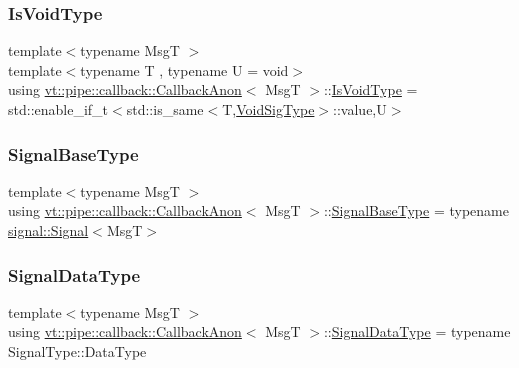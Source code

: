 \subsubsection{\texorpdfstring{Is\+Void\+Type}{IsVoidType}}
{\footnotesize\ttfamily template$<$typename MsgT $>$ \\
template$<$typename T , typename U  = void$>$ \\
using \hyperlink{structvt_1_1pipe_1_1callback_1_1_callback_anon}{vt\+::pipe\+::callback\+::\+Callback\+Anon}$<$ MsgT $>$\+::\hyperlink{structvt_1_1pipe_1_1callback_1_1_callback_anon_a3aa19d4a1044d57ba4af22015331c20a}{Is\+Void\+Type} =  std\+::enable\+\_\+if\+\_\+t$<$std\+::is\+\_\+same$<$T,\hyperlink{structvt_1_1pipe_1_1callback_1_1_callback_anon_a37f2e8be7b6c014a2a33232b678a05cc}{Void\+Sig\+Type}$>$\+::value,U$>$}

\mbox{\label{structvt_1_1pipe_1_1callback_1_1_callback_anon_a84629a45a0c53a8804a4fa68b6b4aaa7}} 
\subsubsection{\texorpdfstring{Signal\+Base\+Type}{SignalBaseType}}
{\footnotesize\ttfamily template$<$typename MsgT $>$ \\
using \hyperlink{structvt_1_1pipe_1_1callback_1_1_callback_anon}{vt\+::pipe\+::callback\+::\+Callback\+Anon}$<$ MsgT $>$\+::\hyperlink{structvt_1_1pipe_1_1callback_1_1_callback_anon_a84629a45a0c53a8804a4fa68b6b4aaa7}{Signal\+Base\+Type} =  typename \hyperlink{structvt_1_1pipe_1_1signal_1_1_signal}{signal\+::\+Signal}$<$MsgT$>$}

\mbox{\label{structvt_1_1pipe_1_1callback_1_1_callback_anon_ac503b95feb44bb0b60c1d69e1ed29074}} 
\subsubsection{\texorpdfstring{Signal\+Data\+Type}{SignalDataType}}
{\footnotesize\ttfamily template$<$typename MsgT $>$ \\
using \hyperlink{structvt_1_1pipe_1_1callback_1_1_callback_anon}{vt\+::pipe\+::callback\+::\+Callback\+Anon}$<$ MsgT $>$\+::\hyperlink{structvt_1_1pipe_1_1callback_1_1_callback_anon_ac503b95feb44bb0b60c1d69e1ed29074}{Signal\+Data\+Type} =  typename Signal\+Type\+::\+Data\+Type}

